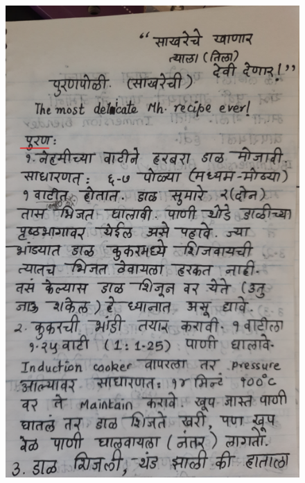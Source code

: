 \documentclass[17pt]{extarticle}  %
\begin{document}
\begin{figure}[h!]
    \centering
    \includegraphics{img/01-s.png}
\end{figure}
\end{document}
